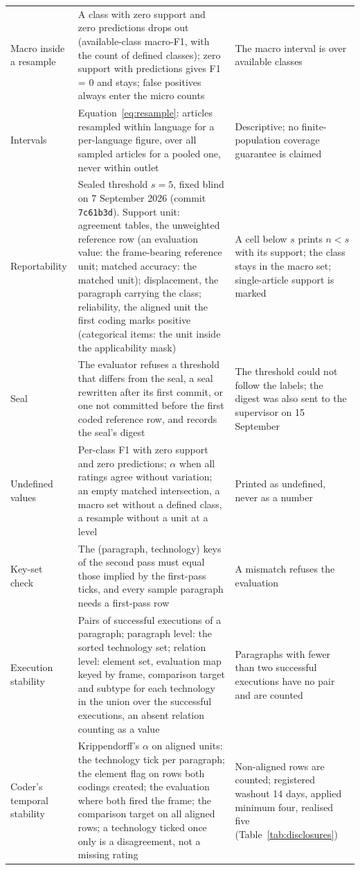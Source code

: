 \begin{longtable}{@{}>{\raggedright\arraybackslash}p{27mm}>{\raggedright\arraybackslash}p{80mm}>{\raggedright\arraybackslash}p{45mm}@{}}
Macro inside a resample & A class with zero support and zero predictions drops out (available-class macro-F1, with the count of defined classes); zero support with predictions gives F1 = 0 and stays; false positives always enter the micro counts & The macro interval is over available classes \\
Intervals & Equation~\eqref{eq:resample}: articles resampled within language for a per-language figure, over all sampled articles for a pooled one, never within outlet & Descriptive; no finite-population coverage guarantee is claimed \\
Reportability & Sealed threshold $s = 5$, fixed blind on 7 September 2026 (commit \texttt{7c61b3d}). Support unit: agreement tables, the unweighted reference row (an evaluation value: the frame-bearing reference unit; matched accuracy: the matched unit); displacement, the paragraph carrying the class; reliability, the aligned unit the first coding marks positive (categorical items: the unit inside the applicability mask) & A cell below $s$ prints $n<s$ with its support; the class stays in the macro set; single-article support is marked \\
Seal & The evaluator refuses a threshold that differs from the seal, a seal rewritten after its first commit, or one not committed before the first coded reference row, and records the seal's digest & The threshold could not follow the labels; the digest was also sent to the supervisor on 15 September \\
Undefined values & Per-class F1 with zero support and zero predictions; $\alpha$ when all ratings agree without variation; an empty matched intersection, a macro set without a defined class, a resample without a unit at a level & Printed as undefined, never as a number \\
Key-set check & The (paragraph, technology) keys of the second pass must equal those implied by the first-pass ticks, and every sample paragraph needs a first-pass row & A mismatch refuses the evaluation \\
Execution stability & Pairs of successful executions of a paragraph; paragraph level: the sorted technology set; relation level: element set, evaluation map keyed by frame, comparison target and subtype for each technology in the union over the successful executions, an absent relation counting as a value & Paragraphs with fewer than two successful executions have no pair and are counted \\
Coder's temporal stability & Krippendorff's $\alpha$ on aligned units: the technology tick per paragraph; the element flag on rows both codings created; the evaluation where both fired the frame; the comparison target on all aligned rows; a technology ticked once only is a disagreement, not a missing rating & Non-aligned rows are counted; registered washout 14 days, applied minimum four, realised five (Table~\ref{tab:disclosures}) \\

\end{longtable}
